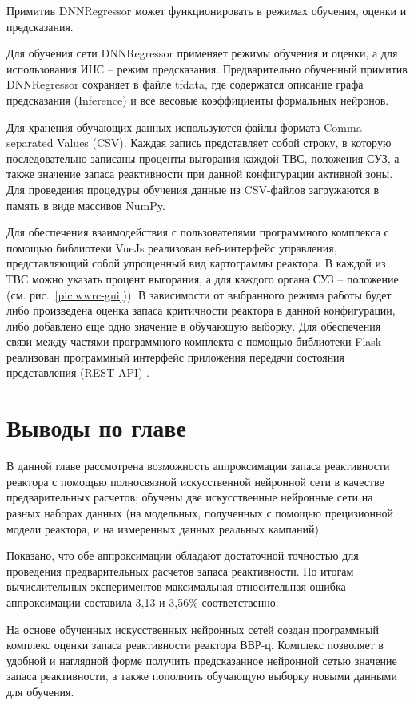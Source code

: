 Примитив DNNRegressor может функционировать в режимах обучения, оценки и
предсказания.

Для обучения сети DNNRegressor применяет режимы обучения и оценки, а для использования ИНС -- режим предсказания.
Предварительно обученный примитив DNNRegressor сохраняет в файле tfdata, где содержатся описание графа предсказания (Inference) и все весовые коэффициенты формальных нейронов.

Для хранения обучающих данных используются файлы формата Comma-separated
Values (CSV).
Каждая запись представляет собой строку, в которую последовательно записаны проценты выгорания каждой ТВС, положения СУЗ, а также значение запаса реактивности при данной конфигурации активной зоны.
Для проведения процедуры обучения данные из CSV-файлов загружаются в память в виде массивов NumPy.

Для обеспечения взаимодействия с пользователями программного комплекса с
помощью библиотеки VueJs реализован веб-интерфейс управления\cite{vuejs,vuejs-2017,vuejs-2016}, представляющий собой упрощенный вид картограммы реактора. В каждой из ТВС можно указать процент выгорания, а для каждого органа СУЗ -- положение (см. рис.~\ref{pic:wwrc-gui})).
В зависимости от выбранного режима работы будет либо произведена оценка запаса критичности реактора в данной конфигурации, либо добавлено еще одно значение в обучающую выборку. 
Для обеспечения связи между частями программного комплекта с помощью библиотеки Flask\cite{flask,flask-2018,flask-2016} реализован программный интерфейс
приложения передачи состояния представления (REST API) \cite{rest-2008,rest-2011}.

\section{Выводы по главе}

В данной главе рассмотрена возможность аппроксимации запаса реактивности реактора с помощью полносвязной искусственной нейронной сети в качестве предварительных расчетов; обучены две искусственные нейронные сети на разных наборах данных (на модельных, полученных с помощью прецизионной модели реактора, и на измеренных данных реальных кампаний). 

Показано, что обе аппроксимации обладают достаточной точностью для проведения предварительных расчетов запаса реактивности.
По итогам вычислительных экспериментов максимальная относительная ошибка аппроксимации составила 3,13 и 3,56\% соответственно.

На основе обученных искусственных нейронных сетей создан программный комплекс оценки запаса реактивности реактора ВВР-ц.
Комплекс позволяет в удобной и наглядной форме получить предсказанное нейронной сетью значение запаса реактивности, а также пополнить обучающую выборку новыми данными для обучения.

